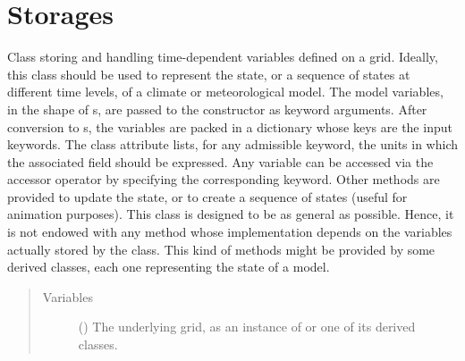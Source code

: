 \documentclass[letterpaper,10pt,english]{sphinxmanual}
\begin{document}
\section{Storages}
\label{\detokenize{api:storages}}

\begin{fulllineitems}
\label{\detokenize{api:storages.grid_data.GridData}}
Class storing and handling time-dependent variables defined on a grid. Ideally, this class should be used to
represent the state, or a sequence of states at different time levels, of a  climate or meteorological model.
The model variables, in the shape of s, are passed to the constructor as keyword arguments.
After conversion to s, the variables are packed in a dictionary whose keys are the input keywords.
The class attribute  lists, for any admissible keyword, the units in which the associated field should
be expressed. Any variable can be accessed via the accessor operator by specifying the corresponding
keyword. Other methods are provided to update the state, or to create a sequence of states (useful for animation purposes).
This class is designed to be as general as possible. Hence, it is not endowed with any method whose
implementation depends on the variables actually stored by the class. This kind of methods might be provided by some
derived classes, each one representing the state of a  model.
\begin{quote}\begin{description}
\item[{Variables}] \leavevmode
{} () \textendash{} The underlying grid, as an instance of {\hyperref[\detokenize{api:grids.grid_xyz.GridXYZ}]{}} or one of its derived classes.

\end{description}\end{quote}


\end{fulllineitems}
\end{document}
